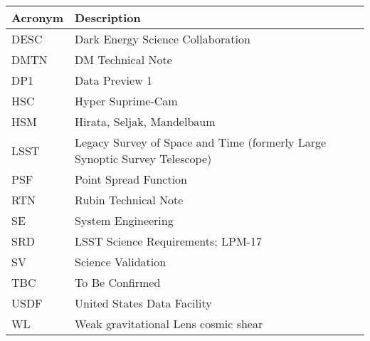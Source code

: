 \addtocounter{table}{-1}
\begin{longtable}{p{}p{}}\hline
\textbf{Acronym} & \textbf{Description}  \\\hline

DESC & Dark Energy Science Collaboration \\\hline
DMTN & DM Technical Note \\\hline
DP1 & Data Preview 1 \\\hline
HSC & Hyper Suprime-Cam \\\hline
HSM & Hirata, Seljak, Mandelbaum \\\hline
LSST & Legacy Survey of Space and Time (formerly Large Synoptic Survey Telescope) \\\hline
PSF & Point Spread Function \\\hline
RTN & Rubin Technical Note \\\hline
SE & System Engineering \\\hline
SRD & LSST Science Requirements; LPM-17 \\\hline
SV & Science Validation \\\hline
TBC & To Be Confirmed \\\hline
USDF & United States Data Facility \\\hline
WL & Weak gravitational Lens cosmic shear \\\hline
\end{longtable}
